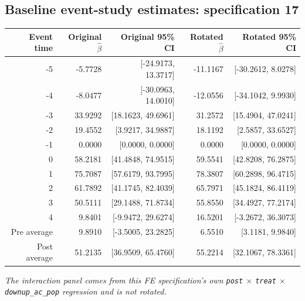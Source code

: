 \documentclass[10pt]{article}
\begin{document}
\subsection*{Baseline event-study estimates: specification 17}
\begin{center}
\scriptsize
\begin{tabular}{r rr rr}
\toprule
Event time & Original $\hat\beta$ & Original 95\% CI & Rotated $\hat\beta$ & Rotated 95\% CI \\
\midrule
-5 & -5.7728 & [-24.9173, 13.3717] & -11.1167 & [-30.2612, 8.0278] \\
-4 & -8.0477 & [-30.0963, 14.0010] & -12.0556 & [-34.1042, 9.9930] \\
-3 & 33.9292 & [18.1623, 49.6961] & 31.2572 & [15.4904, 47.0241] \\
-2 & 19.4552 & [3.9217, 34.9887] & 18.1192 & [2.5857, 33.6527] \\
-1 & 0.0000 & [0.0000, 0.0000] & 0.0000 & [0.0000, 0.0000] \\
0 & 58.2181 & [41.4848, 74.9515] & 59.5541 & [42.8208, 76.2875] \\
1 & 75.7087 & [57.6179, 93.7995] & 78.3807 & [60.2898, 96.4715] \\
2 & 61.7892 & [41.1745, 82.4039] & 65.7971 & [45.1824, 86.4119] \\
3 & 50.5111 & [29.1488, 71.8734] & 55.8550 & [34.4927, 77.2174] \\
4 & 9.8401 & [-9.9472, 29.6274] & 16.5201 & [-3.2672, 36.3073] \\
\midrule
Pre average & 9.8910 & [-3.5005, 23.2825] & 6.5510 & [3.1181, 9.9840] \\
Post average & 51.2135 & [36.9509, 65.4760] & 55.2214 & [32.1067, 78.3361] \\
\bottomrule
\end{tabular}
\end{center}
\medskip
\textit{The interaction panel comes from this FE specification's own \texttt{post} $\times$ \texttt{treat} $\times$ \texttt{downup\_ac\_pop} regression and is not rotated.}
\clearpage
\end{document}
